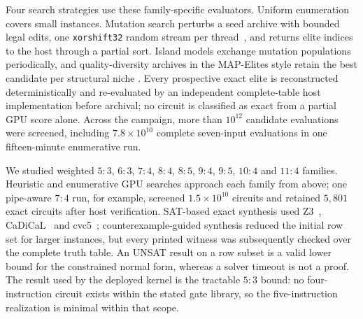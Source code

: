 \documentclass[fleqn,10pt]{wlscirep}
\begin{document}
Four search strategies use these family-specific evaluators. Uniform enumeration covers small instances. Mutation search perturbs a seed archive with bounded legal edits, one \texttt{xorshift32} random stream per thread~\cite{marsaglia2003xorshift}, and returns elite indices to the host through a partial sort. Island models exchange mutation populations periodically, and quality-diversity archives in the MAP-Elites style retain the best candidate per structural niche \cite{mouret2015mapelites}. Every prospective exact elite is reconstructed deterministically and re-evaluated by an independent complete-table host implementation before archival; no circuit is classified as exact from a partial GPU score alone. Across the campaign, more than $10^{12}$ candidate evaluations were screened, including $7.8\times10^{10}$ complete seven-input evaluations in one fifteen-minute enumerative run.

We studied weighted $5{:}3$, $6{:}3$, $7{:}4$, $8{:}4$, $8{:}5$, $9{:}4$, $9{:}5$, $10{:}4$ and $11{:}4$ families. Heuristic and enumerative GPU searches approach each family from above; one pipe-aware $7{:}4$ run, for example, screened $1.5\times10^{10}$ circuits and retained $5{,}801$ exact circuits after host verification. SAT-based exact synthesis used Z3~\cite{demoura2008z3}, CaDiCaL~\cite{biere2024cadical} and cvc5~\cite{barbosa2022cvc5}; counterexample-guided synthesis reduced the initial row set for larger instances, but every printed witness was subsequently checked over the complete truth table. An UNSAT result on a row subset is a valid lower bound for the constrained normal form, whereas a solver timeout is not a proof. The result used by the deployed kernel is the tractable $5{:}3$ bound: no four-instruction circuit exists within the stated gate library, so the five-instruction realization is minimal within that scope.
\end{document}
